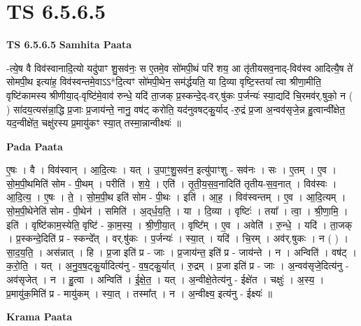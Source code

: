 \documentclass[17pt]{extarticle}
\begin{document}
\section{ TS 6.5.6.5 }

\textbf{TS 6.5.6.5 } \newline
\textbf{Samhita Paata} \newline

-त्ये॒ष वै विव॑स्वानादि॒त्यो यदु॑पाꣳ शु॒सव॑नः॒ स ए॒तमे॒व सो॑मपी॒थं परि॑ शय॒ आ तृ॑तीयसव॒नाद्-विव॑स्व आदित्यै॒ष ते॑ सोमपी॒थ इत्या॑ह॒ विव॑स्वन्तमे॒वाऽऽ*दि॒त्यꣳ सो॑मपी॒थेन॒ सम॑र्द्धयति॒ या दि॒व्या वृष्टि॒स्तया᳚ त्वा श्रीणा॒मीति॒ वृष्टि॑कामस्य श्रीणीया॒द्-वृष्टि॑मे॒वाव॑ रुन्धे॒ यदि॑ ता॒जक् प्र॒स्कन्दे॒द्-वर्.षु॑कः प॒र्जन्यः॑ स्या॒द्यदि॑ चि॒रमव॑र्.षुको॒ न ( ) सा॑दय॒त्यस॑न्ना॒द्धि प्र॒जाः प्र॒जाय॑न्ते॒ नानु॒ वष॑ट् करोति॒ यद॑नुवषट्कु॒र्याद् -रु॒द्रं प्र॒जा अ॒न्वव॑सृजे॒न्न हु॒त्वान्वी᳚क्षेत॒ यद॒न्वीक्षे॑त॒ चक्षु॑रस्य प्र॒मायु॑कꣳ स्या॒त् तस्मा॒न्नान्वीक्ष्यः॑ ॥ \newline

\textbf{Pada Paata} \newline

ए॒षः । वै । विव॑स्वान् । आ॒दि॒त्यः । यत् । उ॒पाꣳ॒॒शु॒सव॑न॒ इत्यु॑पाꣳशु - सव॑नः । सः । ए॒तम् । ए॒व । सो॒म॒पी॒थमिति॑ सोम - पी॒थम् । परीति॑ । श॒ये॒ । एति॑ । तृ॒ती॒य॒स॒व॒नादिति॑ तृतीय-स॒व॒नात् । विव॑स्वः । आ॒दि॒त्य॒ । ए॒षः । ते॒ । सो॒म॒पी॒थ इति॑ सोम - पी॒थः । इति॑ । आ॒ह॒ । विव॑स्वन्तम् । ए॒व । आ॒दि॒त्यम् । सो॒म॒पी॒थेनेति॑ सोम - पी॒थेन॑ । समिति॑ । अ॒द्‌र्ध॒य॒ति॒ । या । दि॒व्या । वृष्टिः॑ । तया᳚ । त्वा॒ । श्री॒णा॒मि॒ । इति॑ । वृष्टि॑काम॒स्येति॒ वृष्टि॑ - का॒म॒स्य॒ । श्री॒णी॒या॒त् । वृष्टि᳚म् । ए॒व । अवेति॑ । रु॒न्धे॒ । यदि॑ । ता॒जक् । प्र॒स्कन्दे॒दिति॑ प्र - स्कन्दे᳚त् । वर्.षु॑कः । प॒र्जन्यः॑ । स्या॒त् । यदि॑ । चि॒रम् । अव॑र्.षुकः । न ( ) । सा॒द॒य॒ति॒ । अस॑न्नात् । हि । प्र॒जा इति॑ प्र - जाः । प्र॒जाय॑न्त॒ इति॑ प्र - जाय॑न्ते । न । अन्विति॑ । वष॑ट् । क॒रो॒ति॒ । यत् । अ॒नु॒व॒ष॒ट्कु॒र्यादित्य॑नु - व॒ष॒ट्कु॒र्यात् । रु॒द्रम् । प्र॒जा इति॑ प्र - जाः । अ॒न्वव॑सृजे॒दित्य॑नु - अव॑सृजेत् । न । हु॒त्वा । अन्विति॑ । ई॒क्षे॒त॒ । यत् । अ॒न्वीक्षे॒तेत्य॑नु - ईक्षे॑त । चक्षुः॑ । अ॒स्य॒ । प्र॒मायु॑क॒मिति॑ प्र - मायु॑कम् । स्या॒त् । तस्मा᳚त् । न । अ॒न्वीक्ष्य॒ इत्य॑नु - ईक्ष्यः॑ ॥  \newline


\textbf{Krama Paata} \newline
\end{document}
